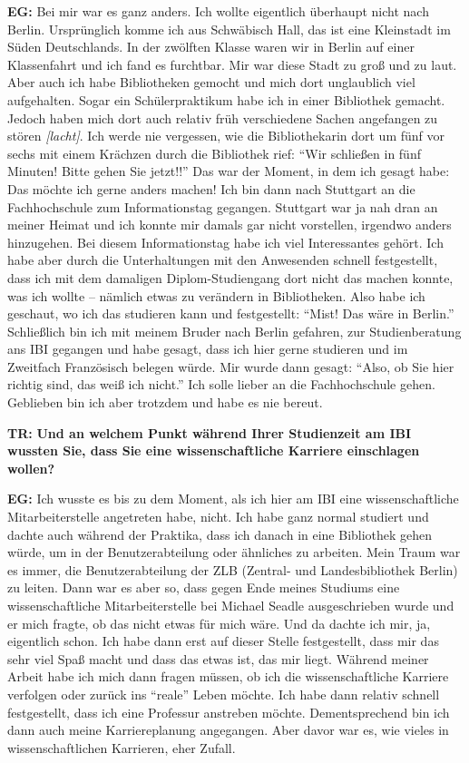 \documentclass[a4paper,
fontsize=11pt,
oneside,
numbers=noperiodatend,
parskip=half-,
bibliography=totoc,
final
]{scrartcl}
\begin{document}
\textbf{EG:} Bei mir war es ganz anders. Ich wollte eigentlich überhaupt
nicht nach Berlin. Ursprünglich komme ich aus Schwäbisch Hall, das ist
eine Kleinstadt im Süden Deutschlands. In der zwölften Klasse waren wir
in Berlin auf einer Klassenfahrt und ich fand es furchtbar. Mir war
diese Stadt zu groß und zu laut. Aber auch ich habe Bibliotheken gemocht
und mich dort unglaublich viel aufgehalten. Sogar ein Schülerpraktikum
habe ich in einer Bibliothek gemacht. Jedoch haben mich dort auch
relativ früh verschiedene Sachen angefangen zu stören
\emph{{[}lacht{]}}. Ich werde nie vergessen, wie die Bibliothekarin dort
um fünf vor sechs mit einem Krächzen durch die Bibliothek rief:
\enquote{Wir schließen in fünf Minuten! Bitte gehen Sie jetzt!!} Das war
der Moment, in dem ich gesagt habe: Das möchte ich gerne anders machen!
Ich bin dann nach Stuttgart an die Fachhochschule zum Informationstag
gegangen. Stuttgart war ja nah dran an meiner Heimat und ich konnte mir
damals gar nicht vorstellen, irgendwo anders hinzugehen. Bei diesem
Informationstag habe ich viel Interessantes gehört. Ich habe aber durch
die Unterhaltungen mit den Anwesenden schnell festgestellt, dass ich mit
dem damaligen Diplom-Studiengang dort nicht das machen konnte, was ich
wollte -- nämlich etwas zu verändern in Bibliotheken. Also habe ich
geschaut, wo ich das studieren kann und festgestellt: \enquote{Mist! Das
wäre in Berlin.} Schließlich bin ich mit meinem Bruder nach Berlin
gefahren, zur Studienberatung ans IBI gegangen und habe gesagt, dass ich
hier gerne studieren und im Zweitfach Französisch belegen würde. Mir
wurde dann gesagt: \enquote{Also, ob Sie hier richtig sind, das weiß ich
nicht.} Ich solle lieber an die Fachhochschule gehen. Geblieben bin ich
aber trotzdem und habe es nie bereut.

\textbf{TR:} \textbf{Und an welchem Punkt während Ihrer Studienzeit am
IBI wussten Sie, dass Sie eine wissenschaftliche Karriere einschlagen
wollen?}

\textbf{EG:} Ich wusste es bis zu dem Moment, als ich hier am IBI eine
wissenschaftliche Mitarbeiterstelle angetreten habe, nicht. Ich habe
ganz normal studiert und dachte auch während der Praktika, dass ich
danach in eine Bibliothek gehen würde, um in der Benutzerabteilung oder
ähnliches zu arbeiten. Mein Traum war es immer, die Benutzerabteilung
der ZLB (Zentral- und Landesbibliothek Berlin) zu leiten. Dann war es
aber so, dass gegen Ende meines Studiums eine wissenschaftliche
Mitarbeiterstelle bei Michael Seadle ausgeschrieben wurde und er mich
fragte, ob das nicht etwas für mich wäre. Und da dachte ich mir, ja,
eigentlich schon. Ich habe dann erst auf dieser Stelle festgestellt,
dass mir das sehr viel Spaß macht und dass das etwas ist, das mir liegt.
Während meiner Arbeit habe ich mich dann fragen müssen, ob ich die
wissenschaftliche Karriere verfolgen oder zurück ins \enquote{reale}
Leben möchte. Ich habe dann relativ schnell festgestellt, dass ich eine
Professur anstreben möchte. Dementsprechend bin ich dann auch meine
Karriereplanung angegangen. Aber davor war es, wie vieles in
wissenschaftlichen Karrieren, eher Zufall.
\end{document}
